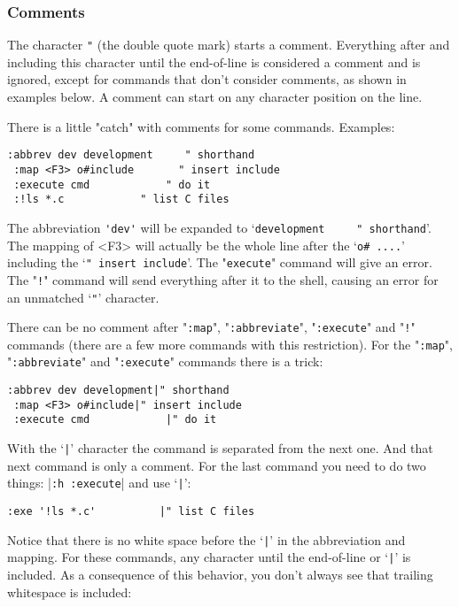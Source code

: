 \subsubsection{Comments}
The character \verb!"! (the double quote mark) starts a comment.
Everything after and including this character until the end-of-line is considered a comment and is ignored, except for commands that don't consider comments, as shown in examples below.
A comment can start on any character position on the line.

There is a little "catch" with comments for some commands.
Examples:

\begin{Verbatim}[samepage=true]
 :abbrev dev development     " shorthand
 :map <F3> o#include       " insert include
 :execute cmd            " do it
 :!ls *.c            " list C files
\end{Verbatim}

The abbreviation \verb!'dev'! will be expanded to `\verb!development     " shorthand!'.
The mapping of <F3> will actually be the whole line after the `\verb!o# ....!' including the `\verb!" insert include!'.
The "\verb!execute!" command will give an error.
The "\verb:!:" command will send everything after it to the shell, causing an error for an unmatched `\verb!"!' character.

There can be no comment after "\verb!:map!", "\verb!:abbreviate!", "\verb!:execute!" and "\verb:!:" commands (there are a few more commands with this restriction).
For the "\verb!:map!", "\verb!:abbreviate!" and "\verb!:execute!" commands there is a trick:

\begin{Verbatim}[samepage=true]
 :abbrev dev development|" shorthand
 :map <F3> o#include|" insert include
 :execute cmd            |" do it
\end{Verbatim}

With the `\verb!|!' character the command is separated from the next one.
And that next command is only a comment.
For the last command you need to do two things: |\verb!:h :execute!| and use `\verb!|!':

\begin{Verbatim}[samepage=true]
 :exe '!ls *.c'          |" list C files
\end{Verbatim}

Notice that there is no white space before the `\verb!|!' in the abbreviation and mapping.
For these commands, any character until the end-of-line or `\verb!|!' is included.
As a consequence of this behavior, you don't always see that trailing whitespace is included:

